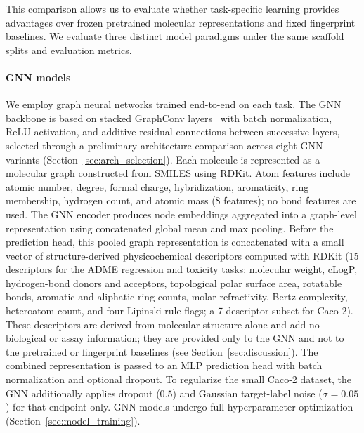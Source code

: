 \documentclass[journal]{IEEEtran}
\begin{document}
This comparison allows us to evaluate whether task-specific learning provides advantages over frozen pretrained molecular representations and fixed fingerprint baselines. We evaluate three distinct model paradigms under the same scaffold splits and evaluation metrics.

\paragraph{GNN models}
We employ graph neural networks trained end-to-end on each task. The GNN backbone is based on stacked GraphConv layers~\cite{morris2019wlgnn} with batch normalization, ReLU activation, and additive residual connections between successive layers, selected through a preliminary architecture comparison across eight GNN variants (Section~\ref{sec:arch_selection}). Each molecule is represented as a molecular graph constructed from SMILES using RDKit. Atom features include atomic number, degree, formal charge, hybridization, aromaticity, ring membership, hydrogen count, and atomic mass (8 features); no bond features are used. The GNN encoder produces node embeddings aggregated into a graph-level representation using concatenated global mean and max pooling. Before the prediction head, this pooled graph representation is concatenated with a small vector of structure-derived physicochemical descriptors computed with RDKit (15 descriptors for the ADME regression and toxicity tasks: molecular weight, cLogP, hydrogen-bond donors and acceptors, topological polar surface area, rotatable bonds, aromatic and aliphatic ring counts, molar refractivity, Bertz complexity, heteroatom count, and four Lipinski-rule flags; a 7-descriptor subset for Caco-2). These descriptors are derived from molecular structure alone and add no biological or assay information; they are provided only to the GNN and not to the pretrained or fingerprint baselines (see Section~\ref{sec:discussion}). The combined representation is passed to an MLP prediction head with batch normalization and optional dropout. To regularize the small Caco-2 dataset, the GNN additionally applies dropout ($0.5$) and Gaussian target-label noise ($\sigma=0.05$) for that endpoint only. GNN models undergo full hyperparameter optimization (Section~\ref{sec:model_training}).
\end{document}
